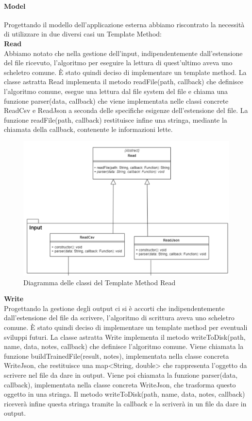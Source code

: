			\paragraph{Model}
			Progettando il modello dell'applicazione esterna abbiamo riscontrato la necessità di utilizzare in due diversi casi un Template Method: \\
			\textbf{Read} \mbox{} \\ 
			Abbiamo notato che nella gestione dell'input, indipendentemente dall'estensione del file ricevuto, l'algoritmo per eseguire la lettura di quest'ultimo aveva uno scheletro comune. È stato quindi deciso di implementare un template method. La classe astratta Read implementa il metodo readFile(path, callback) che definisce l'algoritmo comune, esegue una lettura dal file system del file e chiama una funzione parser(data, callback) che viene implementata nelle classi concrete ReadCsv e ReadJson a seconda delle specifiche esigenze dell'estensione del file. La funzione readFile(path, callback) restituisce infine una stringa, mediante la chiamata della callback, contenente le informazioni lette. 
			\mbox{}
			\begin{figure} [H]
				\includegraphics[width=\linewidth]{./img/Diagrammi/Read.png}
				\caption{Diagramma delle classi del Template Method Read}
			\end{figure}
			\textbf{Write} \mbox{} \\ 
			Progettando la gestione degli output ci si è accorti che indipendentemente dall'estensione del file da scrivere, l'algoritmo di scrittura aveva uno scheletro comune. È stato quindi deciso di implementare un template method per eventuali sviluppi futuri. La classe astratta Write implementa il metodo writeToDisk(path, name, data, notes, callback) che definisce l'algoritmo comune. Viene chiamata la funzione buildTrainedFile(result, notes), implementata nella classe concreta WriteJson, che restituisce una map<String, double> che rappresenta l'oggetto da scrivere nel file da dare in output. Viene poi chiamata la funzione parser(data, callback), implementata nella classe concreta WriteJson, che trasforma questo oggetto in una stringa. Il metodo writeToDisk(path, name, data, notes, callback) riceverà infine questa stringa tramite la callback e la scriverà in un file da dare in output.
